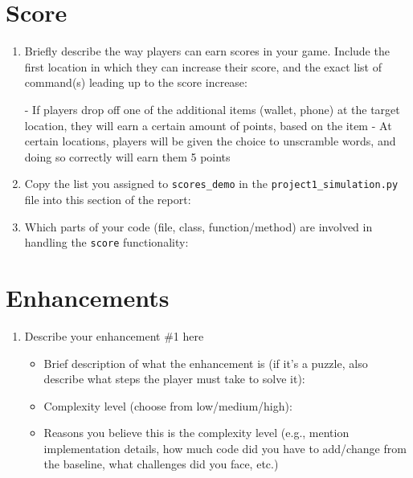 \documentclass[11pt]{article}
\begin{document}
\section*{Score}
\begin{enumerate}

    \item Briefly describe the way players can earn scores in your game. Include the first location in which they can increase their score, and the exact list of command(s) leading up to the score increase:

        - If players drop off one of the additional items (wallet, phone) at the target location, they will earn a certain
        amount of points, based on the item
        - At certain locations, players will be given the choice to unscramble words, and doing so correctly will earn them
        5 points

    \item Copy the list you assigned to \texttt{scores\_demo} in the \texttt{project1\_simulation.py} file into this section of the report:


    \item Which parts of your code (file, class, function/method) are involved in handling the \texttt{score} functionality:
\end{enumerate}

\section*{Enhancements}
\begin{enumerate}
    \item Describe your enhancement \#1 here
    \begin{itemize}
        \item Brief description of what the enhancement is (if it's a puzzle, also describe what steps the player must take to solve it):
        \item Complexity level (choose from low/medium/high):
        \item Reasons you believe this is the complexity level (e.g., mention implementation details, how much code did you have to add/change from the baseline, what challenges did you face, etc.)
    \end{itemize}

\end{enumerate}
\end{document}
